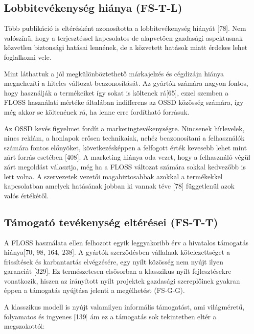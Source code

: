 \documentclass[12pt,magyar,a4paper,oneside]{scrreprt}
\begin{document}
\hypertarget{sec:FS-T-L}{%
\subsection{Lobbitevékenység hiánya (FS-T-L)}\label{sec:FS-T-L}}

Több publikáció is eltérésként azonosította a lobbitevékenység hiányát
{[}78{]}. Nem valószínű, hogy a terjesztéssel kapcsolatos de alapvetően
gazdasági aspektusnak közvetlen biztonsági hatásai lennének, de a
közvetett hatások miatt érdekes lehet foglalkozni vele.

Mint láthattuk a jól megkülönböztethető márkajelzés és cégdizájn hiánya
megnehezíti a hiteles változat beazonosítását. Az gyártók számára nagyon
fontos, hogy használják a termékeiket így sokat is költenek rá{[}65{]},
ezzel szemben a FLOSS használati mértéke általában indifferens az OSSD
közösség számára, így még akkor se költenének rá, ha lenne erre
fordítható forrásuk.

Az OSSD kevés figyelmet fordít a marketingtevékenységre. Nincsenek
hírlevelek, nincs reklám, a honlapok erősen technikaiak, nehéz
beazonosítani a felhasználók számára fontos előnyöket, következésképpen
a felfogott érték kevesebb lehet mint zárt forrás esetében {[}408{]}. A
marketing hiánya oda vezet, hogy a felhasználó végül zárt megoldást
választja, még ha a FLOSS változat számára sokkal kedvezőbb is lett
volna. A szervezetek vezetői magabiztosabbak azokkal a termékekkel
kapcsolatban amelyek hatásának jobban ki vannak téve {[}78{]}
függetlenül azok valós értékétől.

\hypertarget{sec:FS-T-T}{%
\subsection{Támogató tevékenység eltérései (FS-T-T)}\label{sec:FS-T-T}}

A FLOSS használata ellen felhozott egyik leggyakoribb érv a hivatalos
támogatás hiánya{[}70, 98, 164, 238{]}. A gyártók szerződésben vállalnak
kötelezettséget a frissítések és karbantartás elvégzésére, egy nyílt
közösség nem nyújt ilyen garanciát {[}329{]}. Ez természetesen
elsősorban a klasszikus nyílt fejlesztésekre vonatkozik, hiszen az
irányított nyílt projektek gazdasági szereplőinek gyakran éppen a
támogatás nyújtása jelenti a megélhetést (FS-G-G).

A klasszikus modell is nyújt valamilyen informális támogatást, ami
világméretű, folyamatos és ingyenes {[}139{]} ám ez a támogatás sok
tekintetben eltér a megszokottól:
\end{document}
